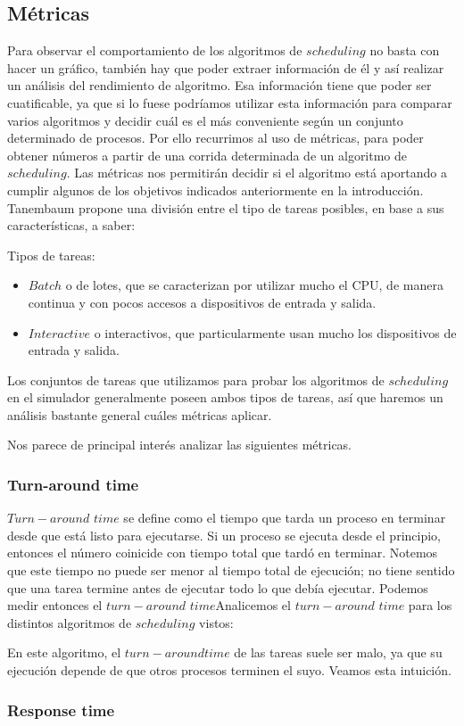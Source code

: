\subsection{Métricas}

Para observar el comportamiento de los algoritmos de $scheduling$ no basta con hacer un gráfico, también hay que poder extraer información de él y así realizar un análisis del rendimiento de algoritmo. Esa informaci\'on tiene que poder ser cuatificable, ya que si lo fuese podr\'iamos utilizar esta informaci\'on para comparar varios algoritmos y decidir cu\'al es el m\'as conveniente seg\'un un conjunto determinado de procesos. Por ello recurrimos al uso de m\'etricas, para poder obtener n\'umeros a partir de una corrida determinada de un algoritmo de $scheduling$. Las m\'etricas nos permitir\'an decidir si el algoritmo est\'a aportando a cumplir algunos de los objetivos indicados anteriormente en la introducci\'on. Tanembaum\cite{Tanen} propone una divisi\'on entre el tipo de tareas posibles, en base a sus caracter\'isticas, a saber:

Tipos de tareas:
\begin{itemize}
	\item $Batch$ o de lotes, que se caracterizan por utilizar mucho el CPU, de manera continua y con pocos accesos a dispositivos de entrada y salida.
	\item $Interactive$ o interactivos, que particularmente usan mucho los dispositivos de entrada y salida.  
\end{itemize}

Los conjuntos de tareas que utilizamos para probar los algoritmos de $scheduling$ en el simulador generalmente poseen ambos tipos de tareas, as\'i que haremos un an\'alisis bastante general cu\'ales m\'etricas aplicar.

Nos parece de principal inter\'es analizar las siguientes m\'etricas.

\subsubsection{Turn-around time}

$Turn-around$ $time$ se define como el tiempo que tarda un proceso en terminar desde que est\'a listo para ejecutarse. Si un proceso se ejecuta desde el principio, entonces el n\'umero coinicide con tiempo total que tard\'o en terminar. Notemos que este tiempo no puede ser menor al tiempo total de ejecuci\'on; no tiene sentido que una tarea termine antes de ejecutar todo lo que deb\'ia ejecutar. Podemos medir entonces el $turn-around$ $time$Analicemos el $turn-around$ $time$ para los distintos algoritmos de $scheduling$ vistos:


En este algoritmo, el $turn-around time$ de las tareas suele ser malo, ya que su ejecuci\'on depende de que otros procesos terminen el suyo. Veamos esta intuici\'on.



\subsubsection{Response time}
